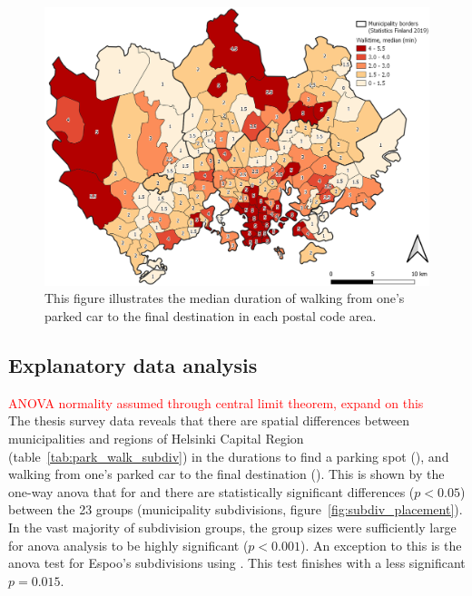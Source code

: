 \begin{figure}[H]%
    \centering
    \includegraphics[width=\textwidth]{images/thesis_postalvis_walkmedian.png}
    \caption[Walktime, median, in the research area]{This figure illustrates the median duration of walking from one's parked car to the final destination in each postal code area.}%
    \label{fig:postalvis_walkmedian}%
\end{figure}

\newpage
\subsection{Explanatory data analysis}
\justify


\textcolor{red}{ANOVA normality assumed through central limit theorem, expand on this} \\
The thesis survey data reveals that there are spatial differences between municipalities and regions of Helsinki Capital Region (table~\ref{tab:park_walk_subdiv}) in the durations to find a parking spot (), and walking from one's parked car to the final destination (). This is shown by the one-way \acrfull{anova} that for  and  there are statistically significant differences ($p < 0.05$) between the 23 groups (municipality subdivisions, figure~\ref{fig:subdiv_placement}). In the vast majority of subdivision groups, the group sizes were sufficiently large for \acrshort{anova} analysis to be highly significant ($p < 0.001$). An exception to this is the \acrshort{anova} test for Espoo's subdivisions using . This test finishes with a less significant $p = 0.015$.

